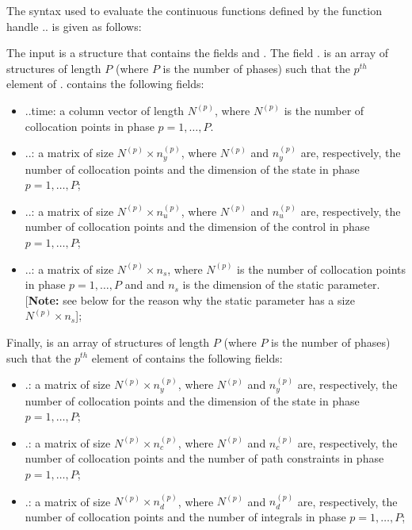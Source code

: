 \documentclass[10pt]{article}
\newcommand{\bfblue}[1]{\textrm{{\color{blue}{\bf #1}}}}
\newcommand{\slred}[1]{\textrm{\color{red}{\sl #1}}}
\begin{document}
The syntax used to evaluate the continuous functions defined by the
function handle \slred{setup}.\bfblue{functions}.\bfblue{continuous}
is given as follows:
\begin{center}
\end{center}
The input \slred{input} is a structure that contains the fields
\bfblue{phase} and \bfblue{auxdata}.  The field
\slred{input}.\bfblue{phase} is an array of structures of length $P$ 
(where $P$ is the number of phases) such that the $p^{th}$ element of
\slred{input}.\bfblue{phase} contains the following fields:
\begin{itemize}
  \item \slred{input}.\bfblue{phase($p$)}.time:  a column vector of
   length $N^{(p)}$, where $N^{(p)}$ is the number of collocation points in phase $p=1,\ldots,P$.  
  \item \slred{input}.\bfblue{phase($p$)}.\bfblue{time}:  a matrix of size 
  $N^{(p)}\times n_y^{(p)}$, where $N^{(p)}$ and $n_y^{(p)}$ are,
  respectively, the number of collocation points and the 
  dimension of the state in phase $p=1,\ldots,P$;
  \item \slred{input}.\bfblue{phase($p$)}.\bfblue{control}:  a matrix
   of size $N^{(p)}\times n_u^{(p)}$, where $N^{(p)}$ and $n_u^{(p)}$ are,
 respectively, the number of collocation points and the 
 dimension of the control in phase $p=1,\ldots,P$;
  \item \slred{input}.\bfblue{phase($p$)}.\bfblue{parameter}:  a matrix
   of size $N^{(p)}\times n_s$, where $N^{(p)}$ is the number of
   collocation points in phase $p=1,\ldots,P$ and and $n_s$ is the
   dimension of the static parameter.  [{\bf Note:}  see below for
   the reason why the static parameter has a size $N^{(p)}\times n_s$];
\end{itemize}
Finally, \slred{output} is an array of structures of length $P$ (where
$P$ is the number of phases) such that the $p^{th}$ element of
\slred{output} contains the following fields:
\begin{itemize}
\item \slred{output}.\bfblue{dynamics}:  a matrix of size $N^{(p)}\times
n_y^{(p)}$, where $N^{(p)}$ and $n_y^{(p)}$ are, respectively, the
number of collocation points and the dimension of the state in phase
$p=1,\ldots,P$;   
\item \slred{output}.\bfblue{path}:  a matrix of size $N^{(p)}\times
n_c^{(p)}$, where $N^{(p)}$ and $n_c^{(p)}$ are, respectively, the
number of collocation points and the number of path constraints 
in phase $p=1,\ldots,P$;   
\item \slred{output}.\bfblue{integrand}:  a matrix of size $N^{(p)}\times
n_d^{(p)}$, where $N^{(p)}$ and $n_d^{(p)}$ are, respectively, the
number of collocation points and the number of integrals 
in phase $p=1,\ldots,P$;   
\end{itemize}
\end{document}
